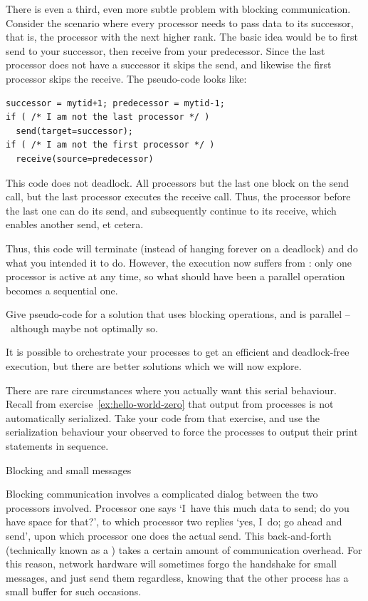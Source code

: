 There is even a third, even more subtle problem with blocking
communication. Consider the scenario where every processor needs to
pass data to its successor, that is, the processor with the next
higher rank. The basic idea would be to first send to your successor,
then receive from your predecessor. Since the last processor does not
have a successor it skips the send, and likewise the first processor
skips the receive. The pseudo-code looks like:
\begin{verbatim}
successor = mytid+1; predecessor = mytid-1;
if ( /* I am not the last processor */ )
  send(target=successor);
if ( /* I am not the first processor */ )
  receive(source=predecessor)
\end{verbatim}
This code does not deadlock. All processors but the last one block on
the send call, but the last processor executes the receive call. Thus,
the processor before the last one can do its send, and subsequently
continue to its receive, which enables another send, et cetera.

Thus, this code will terminate (instead of hanging forever on a
deadlock) and do what you intended it to do. However, the execution
now suffers from : only
one processor is active at any time, so what should have been a
parallel operation becomes a sequential one.

\begin{exercise}
  Give pseudo-code for a solution that uses blocking operations, and is
  parallel --~although maybe not optimally so.
\end{exercise}

It is possible to orchestrate your processes to get an efficient and
deadlock-free execution, but there are better solutions which we will
now explore.

\begin{exercise}
  There are rare circumstances where you actually want this serial
  behaviour. Recall from exercise~\ref{ex:hello-world-zero} that
  output from processes is not automatically serialized. Take your
  code from that exercise, and use the serialization behaviour your
  observed to force the processes to output their print statements in
  sequence.
\end{exercise}

 {Blocking and small messages}

Blocking communication involves a complicated dialog between the two
processors involved. Processor one says `I~have this much data to
send; do you have space for that?', to which processor two replies
`yes, I~do; go ahead and send', upon which processor one does the
actual send. This back-and-forth (technically known as
a ) takes a certain amount of communication
overhead. For this reason, network hardware will sometimes forgo the
handshake for small messages, and just send them regardless, knowing
that the other process has a small buffer for such occasions.

